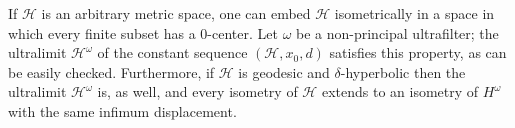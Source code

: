 \documentclass[11pt,letterpaper]{amsart}
\newtheorem{proposition}[theorem]{Proposition}
\begin{document}
If $\mathcal H$ is an arbitrary metric space, one can embed $\mathcal H$ isometrically in a space in which every finite subset has a $0$-center. Let $\omega$ be a non-principal ultrafilter; the ultralimit $\mathcal H^\omega$ of the constant sequence $(\mathcal H, x_0, d)$ satisfies this property, as can be easily checked. Furthermore, if $\mathcal H$ is geodesic and $\delta$-hyperbolic then the ultralimit $\mathcal H^{\omega}$ is, as well, and every isometry of $\mathcal H$ extends to an isometry of $H^\omega$ with the same infimum displacement.

\end{document}
